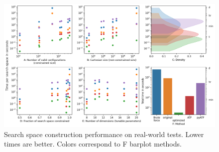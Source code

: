 


\begin{figure}[!htb]
    \centering
    \includegraphics[width=1.0\textwidth]{ics25template/figures/searchspace_construction/results_realworld.png}
    \caption{Search space construction performance on real-world tests. Lower times are better. Colors correspond to F barplot methods.}
    \label{fig:results_realworld}
\end{figure}


